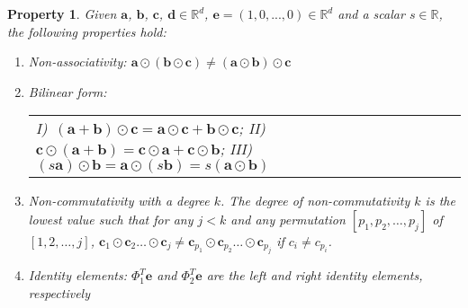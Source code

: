 \documentclass[twoside,11pt]{article}
\def\vec#1{\mathbf{#1}}
\def\svec#1{\vec{#1}}
\def\R{\mathbb{R}}
\def\magicoperation{\mo}
\def\mo{\odot}
\newcounter{properties}
\newtheorem{property}{Property}
\def\finalcomment#1#2{}
\begin{document}
\finalcomment{definition 3: I don't think this can be regarded as a definition, since it does not define anything rigorously ("with a very high degree k") and we do not know whether such an operation exists at all, since this has not been clarified by the authors themselves clearly.}{R3.7}
\begin{property}
\label{ideal_operation}
Given $\svec{a}$, $\svec{b}$, $\svec{c}$, $\svec{d} \in {\R^d}$, $\vec e = (1,0,...,0) \in \R^d$ and a scalar $s \in \R$, the following properties hold:
\begin{enumerate}
\renewcommand{\labelenumi}{\ref{ideal_operation}.\arabic{enumi}}
 \renewcommand{\labelenumii}{\Roman{enumii})}
\item Non-associativity: $\svec{a} \magicoperation (\svec{b} \magicoperation \svec{c})\neq (\svec{a} \magicoperation \svec{b}) \magicoperation \svec{c}$ \label{p_associativity}
\item \label{p_dist} Bilinear form:
\begin{tabular}{p{10cm}}
I)~$(\svec{a}+\svec{b})\magicoperation \svec{c}=\svec{a}\magicoperation\svec{c}+\svec{b}\magicoperation\svec{c}$;
II)~$\svec{c}\magicoperation(\svec{a}+\svec{b}) =\svec{c}\magicoperation\svec{a}+\svec{c}\magicoperation\svec{b}$;
III)~$(s\svec{a}) \mo \svec{b} = \svec{a} \mo (s\svec{b}) = s(\svec{a} \mo \svec{b})$
\end{tabular}
\item Non-commutativity with a degree $k$. The degree of non-commutativity $k$ is the lowest value such that for any $j<k$ and any permutation $[p_1,p_2,\ldots,p_j]$ of $[1,2,\ldots,j]$,  
$\vec c_1 \magicoperation \vec c_2 \ldots \magicoperation \vec c_j  \neq \vec c_{p_1} \magicoperation \vec c_{p_2} \ldots \magicoperation \vec c_{p_j} $ if $c_i \neq c_{p_i}$. \label{p_comm}
\item Identity elements: $\Phi_1^T\vec e$  and $\Phi_2^T\vec e$ are the left and right identity elements, respectively \label{identity}

\end{enumerate}
\end{property}
\end{document}
